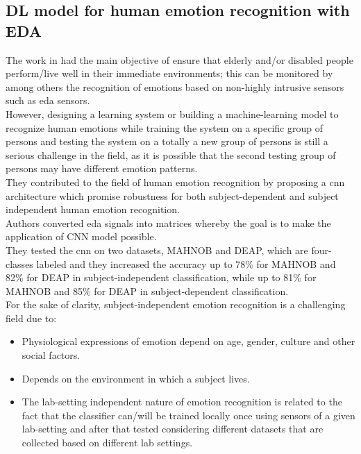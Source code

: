 \subsection{DL model for human emotion recognition with EDA}
The work in \cite{al2019deep} had the main objective of ensure that elderly and/or disabled people perform/live well in their immediate environments; this can be monitored by among others the recognition of emotions based on non-highly intrusive sensors such as \gls{eda} sensors.
\\
However, designing a learning system or building a machine-learning model to recognize human emotions while training the system on a specific group of persons and testing the system on a totally a new group of persons is still a serious challenge in the field, as it is possible that the second testing group of persons may have different emotion patterns.
\\ \indent
They contributed to the field of human emotion recognition by proposing a \gls{cnn} architecture which promise robustness for both subject-dependent and subject independent human emotion recognition.
\\
Authors converted \gls{eda} signals into matrices whereby the goal is to make the application of CNN model possible.
\\
They tested the \gls{cnn} on two datasets, MAHNOB and DEAP, which are four-classes labeled and they increased the accuracy up to 78\% for MAHNOB and 82\% for DEAP in subject-independent classification, while up to 81\% for MAHNOB and 85\% for DEAP in subject-dependent classification.
\\ \indent
For the sake of clarity, subject-independent emotion recognition is a challenging field due to:
\begin{itemize}
	\item Physiological expressions of emotion depend on age, gender, culture and other social factors.
	\item Depends on the environment in which a subject lives.
	\item The lab-setting independent nature of emotion recognition is related to the fact that the classifier can/will be trained locally once using sensors of a given lab-setting and after that tested considering different datasets that are collected based on different lab settings. 
\end{itemize}

